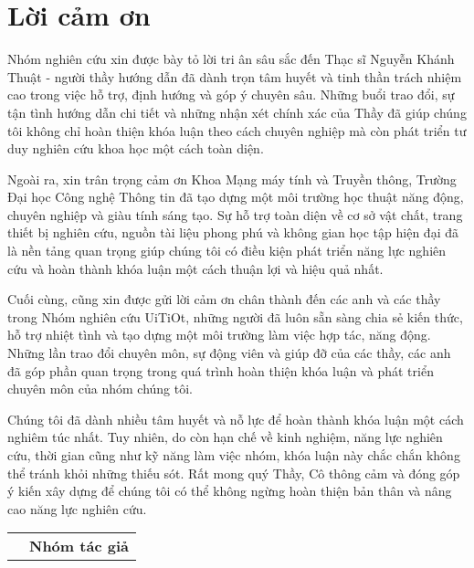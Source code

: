 \chapter*{Lời cảm ơn}
Nhóm nghiên cứu xin được bày tỏ lời tri ân sâu sắc đến Thạc sĩ Nguyễn Khánh Thuật - người thầy hướng dẫn đã dành trọn tâm huyết và tinh thần trách nhiệm cao trong việc hỗ trợ, định hướng và góp ý chuyên sâu. Những buổi trao đổi, sự tận tình hướng dẫn chi tiết và những nhận xét chính xác của Thầy đã giúp chúng tôi không chỉ hoàn thiện khóa luận theo cách chuyên nghiệp mà còn phát triển tư duy nghiên cứu khoa học một cách toàn diện.

Ngoài ra, xin trân trọng cảm ơn Khoa Mạng máy tính và Truyền thông, Trường Đại học Công nghệ Thông tin đã tạo dựng một môi trường học thuật năng động, chuyên nghiệp và giàu tính sáng tạo. Sự hỗ trợ toàn diện về cơ sở vật chất, trang thiết bị nghiên cứu, nguồn tài liệu phong phú và không gian học tập hiện đại đã là nền tảng quan trọng giúp chúng tôi có điều kiện phát triển năng lực nghiên cứu và hoàn thành khóa luận một cách thuận lợi và hiệu quả nhất.

Cuối cùng, cũng xin được gửi lời cảm ơn chân thành đến các anh và các thầy trong Nhóm nghiên cứu UiTiOt, những người đã luôn sẵn sàng chia sẻ kiến thức, hỗ trợ nhiệt tình và tạo dựng một môi trường làm việc hợp tác, năng động. Những lần trao đổi chuyên môn, sự động viên và giúp đỡ của các thầy, các anh đã góp phần quan trọng trong quá trình hoàn thiện khóa luận và phát triển chuyên môn của nhóm chúng tôi.

Chúng tôi đã dành nhiều tâm huyết và nỗ lực để hoàn thành khóa luận một cách nghiêm túc nhất. Tuy nhiên, do còn hạn chế về kinh nghiệm, năng lực nghiên cứu, thời gian cũng như kỹ năng làm việc nhóm, khóa luận này chắc chắn không thể tránh khỏi những thiếu sót. Rất mong quý Thầy, Cô thông cảm và đóng góp ý kiến xây dựng để chúng tôi có thể không ngừng hoàn thiện bản thân và nâng cao năng lực nghiên cứu.
    {
    \begin{table}[ht]
        \centering
        \begin{tabular}{>{\centering}m{}>{\centering\arraybackslash}m{}}
            & \textbf{Nhóm tác giả}

        \end{tabular}
    \end{table}
}